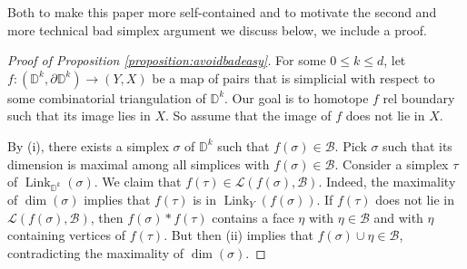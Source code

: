 \documentclass[11pt]{amsart}
\numberwithin{equation}{section}
\theoremstyle{plain}
\theoremstyle{definition}
\theoremstyle{remark}
\newcommand\cB{\ensuremath{\mathcal{B}}}
\newcommand\cL{\ensuremath{\mathcal{L}}}
\newcommand\bbD{\ensuremath{\mathbb{D}}}
\DeclareMathOperator{\Link}{Link}
\begin{document}
Both to make this paper more self-contained and to motivate the second and more technical bad
simplex argument we discuss below, we include a proof.

\begin{proof}[Proof of Proposition \ref{proposition:avoidbadeasy}]
For some $0 \leq k \leq d$, let $f\colon (\bbD^k,\partial \bbD^k) \rightarrow (Y,X)$ 
be a map of pairs that is simplicial with respect to some combinatorial triangulation
of $\bbD^k$.  Our goal is to homotope $f$ rel boundary such that its image lies in $X$.
So assume that the image of $f$ does not lie in $X$.

By (i), there exists a simplex $\sigma$ of $\bbD^k$ such that $f(\sigma) \in \cB$.  Pick 
$\sigma$ such that its dimension is maximal among all simplices with $f(\sigma) \in \cB$.  
Consider a simplex $\tau$ of $\Link_{\bbD^k}(\sigma)$.  We claim that $f(\tau) \in \cL(f(\sigma),\cB)$.
Indeed, the maximality of $\dim(\sigma)$ implies that $f(\tau)$ is in $\Link_Y(f(\sigma))$.  If
$f(\tau)$ does not lie in $\cL(f(\sigma),\cB)$, then $f(\sigma) \ast f(\tau)$ contains a face
$\eta$ with $\eta \in \cB$ and with $\eta$ containing vertices of $f(\tau)$.  But then
(ii) implies that $f(\sigma) \cup \eta \in \cB$, contradicting the maximality of
$\dim(\sigma)$.


\end{proof}
\end{document}
